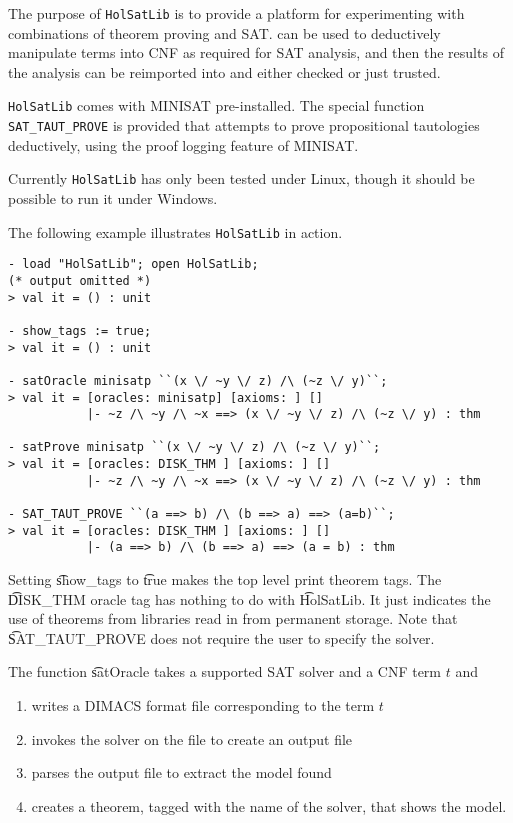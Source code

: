 The purpose of {\tt{HolSatLib}} is to provide a platform
for experimenting with combinations of theorem proving and
SAT. \HOL{} can be used to deductively manipulate terms into CNF as
required for SAT analysis, and then the results of the analysis
can be reimported into \HOL{} and either checked or just trusted.

{\tt HolSatLib} comes with MINISAT pre-installed. The special function {\tt SAT\_TAUT\_PROVE} 
is provided that attempts to prove propositional tautologies deductively, using
the proof logging feature of MINISAT.
 
Currently {\tt HolSatLib} has only been tested under Linux, though it should be
possible to run it under Windows.

The following example illustrates {\tt{HolSatLib}} in action.

\begin{session}\begin{verbatim}
- load "HolSatLib"; open HolSatLib;
(* output omitted *)
> val it = () : unit

- show_tags := true;
> val it = () : unit

- satOracle minisatp ``(x \/ ~y \/ z) /\ (~z \/ y)``;
> val it = [oracles: minisatp] [axioms: ] []
           |- ~z /\ ~y /\ ~x ==> (x \/ ~y \/ z) /\ (~z \/ y) : thm

- satProve minisatp ``(x \/ ~y \/ z) /\ (~z \/ y)``;
> val it = [oracles: DISK_THM ] [axioms: ] [] 
           |- ~z /\ ~y /\ ~x ==> (x \/ ~y \/ z) /\ (~z \/ y) : thm

- SAT_TAUT_PROVE ``(a ==> b) /\ (b ==> a) ==> (a=b)``;
> val it = [oracles: DISK_THM ] [axioms: ] [] 
           |- (a ==> b) /\ (b ==> a) ==> (a = b) : thm
\end{verbatim}
\end{session}

Setting \t{show\_tags} to \t{true} makes the \HOL{} top
level print theorem tags. The \t{DISK\_THM} oracle tag has nothing to do with \t{HolSatLib}. It just indicates the use of theorems from \HOL{} libraries read in from permanent storage. Note that \t{SAT\_TAUT\_PROVE} does not require the user to specify the solver.

The function \t{satOracle}  takes a supported SAT solver and a CNF term
$t$ and

\begin{enumerate}
\item writes a DIMACS format file corresponding to the term $t$
\item invokes the solver on the file to create an output file
\item parses the output file to extract the model found
\item creates a theorem, tagged with the name of the solver, that shows the model.
\end{enumerate}

